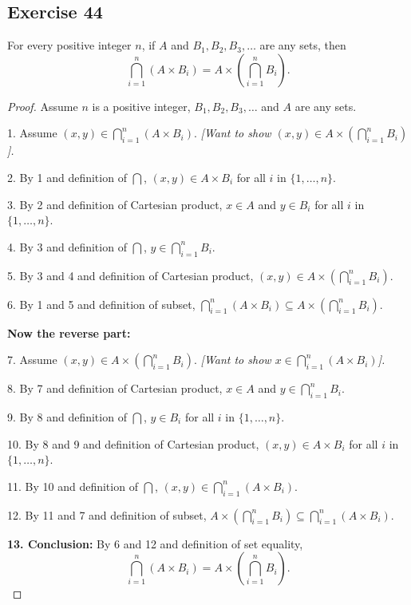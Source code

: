 \documentclass[14pt]{extarticle}
\newcommand{\dps}{\displaystyle}
\begin{document}
\subsection{Exercise 44}
For every positive integer $n$, if $A$ and \(B_1, B_2, B_3, \ldots\) are any sets, then
\[
\bigcap_{i=1}^n (A \times B_i) = A \times \left( \bigcap_{i=1}^n B_i\right).
\]
\begin{proof}
Assume $n$ is a positive integer, \(B_1, B_2, B_3, \ldots\) and $A$ are any sets.

1. Assume \(\dps (x,y) \in \bigcap_{i=1}^n (A \times B_i)\). 
{\it [Want to show \(\dps (x,y) \in A \times \left(\bigcap _{i=1}^n B_i\right)\)].}

2. By 1 and definition of \(\dps \bigcap\), \((x,y) \in A \times B_i\) for all $i$ in \(\{1, \ldots, n\}\).

3. By 2 and definition of Cartesian product, \(x \in A\) and \(y \in B_i\) for all $i$ in \(\{1, \ldots, n\}\).

4. By 3 and definition of $\dps \bigcap$, \(\dps y \in \bigcap_{i=1}^n B_i\).

5. By 3 and 4 and definition of Cartesian product, \(\dps (x, y) \in A \times \left(\bigcap_{i=1}^n B_i\right)\).

6. By 1 and 5 and definition of subset, \(\dps \bigcap _{i=1}^n (A \times B_i) \subseteq A \times \left(
\bigcap _{i=1}^n B_i\right).\)

{\bf Now the reverse part:}

7. Assume \(\dps (x,y) \in A \times \left( \bigcap_{i=1}^n B_i\right)\). {\it [Want to show \(\dps x \in \bigcap _{i=1}^n (A \times B_i)\)].}

8. By 7 and definition of Cartesian product, \(x \in A\) and \(\dps y \in \bigcap_{i=1}^n B_i\).

9. By 8 and definition of $\dps \bigcap$, \(y \in B_i\) for all $i$ in \(\{1, \ldots, n\}\).

10. By 8 and 9 and definition of Cartesian product, \((x,y) \in A \times B_i\) for all $i$ in \(\{1, \ldots, n\}\).

11. By 10 and definition of $\dps \bigcap$, \((x,y) \in \dps \bigcap_{i=1}^n (A \times B_i)\).

12. By 11 and 7 and definition of subset, \(\dps A \times \left(\bigcap_{i=1}^n B_i\right) \subseteq \bigcap_{i=1}^n 
(A \times B_i)\).

{\bf 13. Conclusion:} By 6 and 12 and definition of set equality,
\[
\bigcap_{i=1}^n (A \times B_i) = A \times \left( \bigcap_{i=1}^n B_i\right).
\]
\end{proof}
\end{document}
